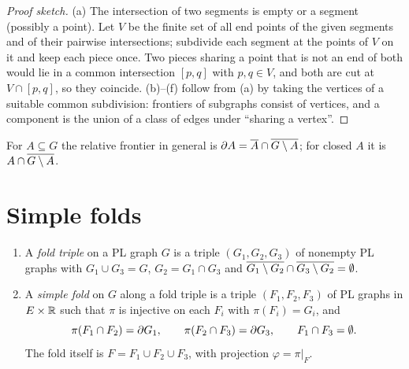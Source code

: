 \begin{proof}[Proof sketch]
(a) The intersection of two segments is empty or a segment (possibly a point). Let $V$ be the finite set of all end points of the given segments and of
their pairwise intersections; subdivide each segment at the points of $V$ on it and keep each piece once. Two pieces sharing a point that is not an end of
both would lie in a common intersection $[p,q]$ with $p,q\in V$, and both are cut at $V\cap[p,q]$, so they coincide. (b)--(f) follow from (a) by taking the
vertices of a suitable common subdivision: frontiers of subgraphs consist of vertices, and a component is the union of a class of edges under ``sharing a
vertex''.
\end{proof}


For $A\subseteq G$ the relative frontier in general is $\partial A=\overline{A}\cap\overline{G\setminus A}$; for closed $A$ it is $A\cap\overline{G\setminus A}$.

\section{Simple folds}

\begin{definition}\label{def:fold}
\begin{enumerate}[label=(\alph*)]
\item A \emph{fold triple} on a PL graph $G$ is a triple $(G_1,G_2,G_3)$ of nonempty PL graphs with $G_1\cup G_3=G$, $G_2=G_1\cap G_3$ and
$\overline{G_1\setminus G_2}\cap\overline{G_3\setminus G_2}=\emptyset$.
\item A \emph{simple fold} on $G$ along a fold triple is a triple $(F_1,F_2,F_3)$ of PL graphs in $E\times\mathbb{R}$ such that $\pi$ is injective on each $F_i$ with
$\pi(F_i)=G_i$, and
\[
\pi(F_1\cap F_2)=\partial G_1,\qquad \pi(F_2\cap F_3)=\partial G_3,\qquad F_1\cap F_3=\emptyset .
\]
The fold itself is $F=F_1\cup F_2\cup F_3$, with projection $\varphi=\pi|_F$.
\end{enumerate}
\end{definition}


